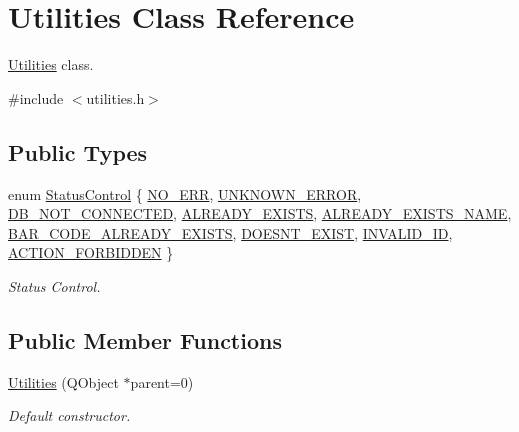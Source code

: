 \hypertarget{class_utilities}{\section{\-Utilities \-Class \-Reference}
\label{class_utilities}
}


\hyperlink{class_utilities}{\-Utilities} class.  




{\ttfamily \#include $<$utilities.\-h$>$}

\subsection*{\-Public \-Types}
\begin{DoxyCompactItemize}
\item 
enum \hyperlink{class_utilities_a2974f062d85bdb0c444a1cbe554bf228}{\-Status\-Control} \{ \*
\hyperlink{class_utilities_a2974f062d85bdb0c444a1cbe554bf228a401b1c4377779dc72a5046ca7b4bd02a}{\-N\-O\-\_\-\-E\-R\-R}, 
\hyperlink{class_utilities_a2974f062d85bdb0c444a1cbe554bf228aa1e17c2f5a7a36fa1d2730d2ec5d2ddc}{\-U\-N\-K\-N\-O\-W\-N\-\_\-\-E\-R\-R\-O\-R}, 
\hyperlink{class_utilities_a2974f062d85bdb0c444a1cbe554bf228a7e50e5e4ba0dc0d459203bea7516d14d}{\-D\-B\-\_\-\-N\-O\-T\-\_\-\-C\-O\-N\-N\-E\-C\-T\-E\-D}, 
\hyperlink{class_utilities_a2974f062d85bdb0c444a1cbe554bf228a3f2a7c09f27d40e71a35539d78dae5f3}{\-A\-L\-R\-E\-A\-D\-Y\-\_\-\-E\-X\-I\-S\-T\-S}, 
\*
\hyperlink{class_utilities_a2974f062d85bdb0c444a1cbe554bf228acf96c7749b5fc58a0646208835c22c9a}{\-A\-L\-R\-E\-A\-D\-Y\-\_\-\-E\-X\-I\-S\-T\-S\-\_\-\-N\-A\-M\-E}, 
\hyperlink{class_utilities_a2974f062d85bdb0c444a1cbe554bf228aff3c4a322caea65bd8410927e4b8c83d}{\-B\-A\-R\-\_\-\-C\-O\-D\-E\-\_\-\-A\-L\-R\-E\-A\-D\-Y\-\_\-\-E\-X\-I\-S\-T\-S}, 
\hyperlink{class_utilities_a2974f062d85bdb0c444a1cbe554bf228a497c8c8171a373b9aefc41df20927f3a}{\-D\-O\-E\-S\-N\-T\-\_\-\-E\-X\-I\-S\-T}, 
\hyperlink{class_utilities_a2974f062d85bdb0c444a1cbe554bf228ac3c51b085914ff267deb2b50c32e9341}{\-I\-N\-V\-A\-L\-I\-D\-\_\-\-I\-D}, 
\*
\hyperlink{class_utilities_a2974f062d85bdb0c444a1cbe554bf228aeba0ecea2835782b051419e056fb280e}{\-A\-C\-T\-I\-O\-N\-\_\-\-F\-O\-R\-B\-I\-D\-D\-E\-N}
 \}
\begin{DoxyCompactList}\small\item\em \-Status \-Control. \end{DoxyCompactList}\end{DoxyCompactItemize}
\subsection*{\-Public \-Member \-Functions}
\begin{DoxyCompactItemize}
\item 
\hyperlink{class_utilities_a38f1c42a0191015f4031ea2207a4e3d3}{\-Utilities} (\-Q\-Object $\ast$parent=0)
\begin{DoxyCompactList}\small\item\em \-Default constructor. \end{DoxyCompactList}\end{DoxyCompactItemize}
